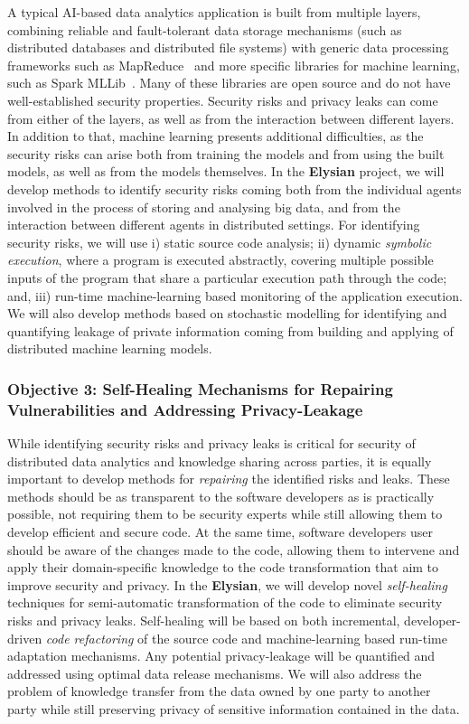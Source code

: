 \documentclass[a4paper,11pt]{article}
\newcommand{\project}[1]{\textbf{#1}\xspace}
\newcommand{\SECURITY}{\project{Elysian}}
\newcommand{\TheProject}{\SECURITY}
\begin{document}
A typical AI-based data analytics application is built from multiple layers, combining reliable and fault-tolerant data storage mechanisms (such as distributed databases and distributed file systems) with generic data processing frameworks such as MapReduce~\cite{mapreduce} and more specific libraries for machine learning, such as Spark MLLib~\cite{mllib}. Many of these libraries are open source and do not have well-established security properties. Security risks and privacy leaks can come from either of the layers, as well as from the interaction between different layers. In addition to that, machine learning presents additional difficulties, as the security risks can arise both from training the models and from using the built models, as well as from the models themselves. In the \TheProject{} project, we will develop methods to identify security risks coming both from the individual agents involved in the process of storing and analysing big data, and from the interaction between different agents in distributed settings. For identifying security risks, we will use i) static source code analysis; ii) dynamic \emph{symbolic execution}, where a program is executed abstractly, covering multiple possible inputs of the program that share a particular execution path through the code; and, iii) run-time machine-learning based monitoring of the application execution. We will also develop methods based on stochastic modelling for identifying and quantifying leakage of private information coming from building and applying of distributed machine learning models.

\subsubsection*{Objective 3: Self-Healing Mechanisms for Repairing Vulnerabilities and Addressing Privacy-Leakage}
While identifying security risks and privacy leaks is critical for security of distributed data analytics and knowledge sharing across parties, it is equally important to develop methods for \emph{repairing} the identified risks and leaks. These methods should be as transparent to the software developers as is practically possible, not requiring them to be security experts while still allowing them to develop efficient and secure code. At the same time, software developers user should be aware of the changes made to the code, allowing them to intervene and apply their domain-specific knowledge to the code transformation that aim to improve security and privacy. In the \TheProject{}, we will develop novel \emph{self-healing} techniques for semi-automatic transformation of the code to eliminate security risks and privacy leaks. Self-healing will be based on both incremental, developer-driven \emph{code refactoring} of the source code and machine-learning based run-time adaptation mechanisms. Any potential privacy-leakage will be quantified and addressed using optimal data release mechanisms. We will also address the problem of knowledge transfer from the data owned by one party to another party while still preserving privacy of sensitive information contained in the data. 
\end{document}
